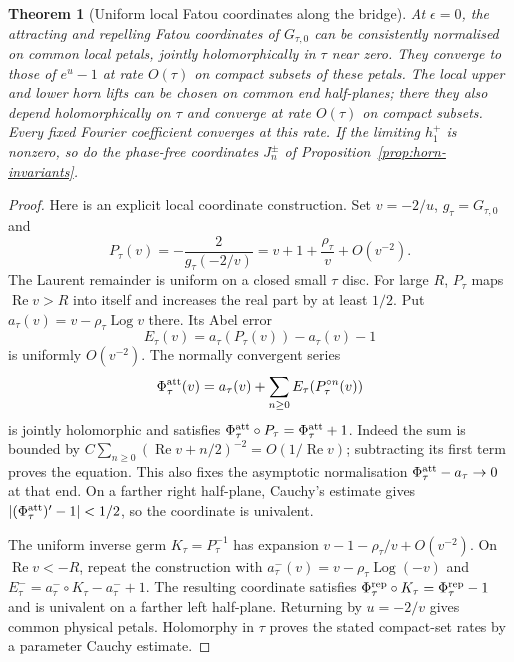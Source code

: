 \documentclass[11pt]{article}
\newtheorem{theorem}{Theorem}
\newcommand{\re}{\operatorname{Re}}
\newcommand{\Log}{\operatorname{Log}}
\begin{document}
\begin{theorem}[Uniform local Fatou coordinates along the bridge]
\label{thm:degree-fatou}
At $\epsilon=0$, the attracting and repelling Fatou coordinates of
$G_{\tau,0}$ can be consistently normalised on common local petals,
jointly holomorphically in $\tau$ near zero. They converge to those
of $e^u-1$ at rate $O(\tau)$ on compact subsets of these petals.
The local upper and lower horn lifts can be chosen on common end
half-planes; there they also depend holomorphically on $\tau$ and
converge at rate $O(\tau)$ on compact subsets. Every fixed Fourier
coefficient converges at this rate. If the limiting $h_1^+$ is nonzero,
so do the phase-free coordinates $J_n^\pm$ of
Proposition~\ref{prop:horn-invariants}.
\end{theorem}
\begin{proof}
Here is an explicit local coordinate construction. Set $v=-2/u$,
$g_\tau=G_{\tau,0}$ and
\[
 P_\tau(v)=-\frac2{g_\tau(-2/v)}
          =v+1+\frac{\rho_\tau}{v}+O(v^{-2}).
\]
The Laurent remainder is uniform on a closed small $\tau$ disc.
For large $R$, $P_\tau$ maps $\re v>R$ into itself and increases
the real part by at least $1/2$. Put
$a_\tau(v)=v-\rho_\tau\Log v$ there. Its Abel error
\[
 E_\tau(v)=a_\tau(P_\tau(v))-a_\tau(v)-1
\]
is uniformly $O(v^{-2})$. The normally convergent series
\[
 \Phi^{\rm att}_\tau(v)
 =a_\tau(v)+\sum_{n\ge0}E_\tau(P_\tau^{\circ n}(v))
\]
is jointly holomorphic and satisfies
$\Phi^{\rm att}_\tau\circ P_\tau=\Phi^{\rm att}_\tau+1$.
Indeed the sum is bounded by
$C\sum_{n\ge0}(\re v+n/2)^{-2}=O(1/\re v)$; subtracting its
first term proves the equation. This also fixes the asymptotic
normalisation $\Phi^{\rm att}_\tau-a_\tau\to0$ at that end.
On a farther right half-plane, Cauchy's estimate gives
$|(\Phi^{\rm att}_\tau)'-1|<1/2$, so the coordinate is univalent.

The uniform inverse germ $K_\tau=P_\tau^{-1}$ has expansion
$v-1-\rho_\tau/v+O(v^{-2})$. On $\re v<-R$, repeat the construction
with $a^-_\tau(v)=v-\rho_\tau\Log(-v)$ and
$E^-_\tau=a^-_\tau\circ K_\tau-a^-_\tau+1$.
The resulting coordinate satisfies
$\Phi^{\rm rep}_\tau\circ K_\tau=\Phi^{\rm rep}_\tau-1$ and is
univalent on a farther left half-plane. Returning by $u=-2/v$ gives
common physical petals. Holomorphy in $\tau$ proves the stated
compact-set rates by a parameter Cauchy estimate.


\end{proof}
\end{document}
